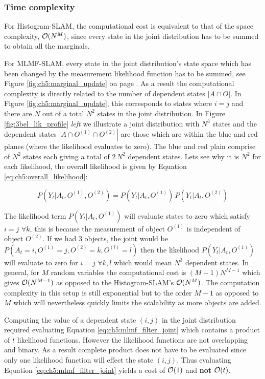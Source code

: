 \subsubsection{Time complexity}

For Histogram-SLAM, the computational cost is equivalent to that of the space complexity, $\operatorname{\mathcal{O}}(N^M)$,
since every state in the joint distribution has to be summed to obtain all the marginals.

For MLMF-SLAM, every state in the joint distribution's state space which has been changed by the measurement likelihood function 
has to be summed, see Figure \ref{fig:ch5:marginal_update} on page \pageref{fig:ch5:marginal_update}. As a result the computational complexity is directly related to the number 
of dependent states $|A \cap O|$. In Figure \ref{fig:ch5:marginal_update}, this corresponds to states where $i = j$ and there are $N$ out of a total $N^2$ states
in the joint distribution. In Figure \ref{fig:3bel_lik_profile} \textit{left}
we illustrate a joint distribution with $N^3$ states and the dependent states $|A \cap O^{(1)} \cap O^{(2)}|$ are those which 
are within the blue and red planes (where the likelihood evaluates to zero). The blue and red plain comprise of $N^2$ states each 
giving a total of $2\,N^2$ dependent states. Lets see why it is $N^2$ for each likelihood, the overall likelihood is given by 
Equation \ref{eq:ch5:overall_likelihood}:

\begin{equation}
 P(Y_t|A_t,O^{(1)},O^{(2)}) = P(Y_t|A_t,O^{(1)})\, P(Y_t|A_t,O^{(2)}) \label{eq:ch5:overall_likelihood}
\end{equation}

The likelihood term $P(Y_t|A_t,O^{(1)})$ will evaluate states to zero which satisfy $i=j$ $\forall k$, this is because 
the measurement of object $O^{(1)}$ is independent of object $O^{(2)}$. If we had 3 objects, the joint would be
$P(A_t=i,O^{(1)}=j,O^{(2)}=k,O^{(l)}=l)$ then the likelihood $P(Y_t|A_t,O^{(1)})$ will evaluate to 
zero for $i=j$ $\forall k,l$ which would mean $N^3$ dependent states.
In general, for $M$ random variables the computational cost is $(M-1) N^{M-1}$ which gives $\operatorname{\mathcal{O}}(N^{M-1})$ as opposed to the Histogram-SLAM's $\operatorname{\mathcal{O}}(N^M)$. 
The computation complexity in this setup is still exponential but to the order $M-1$ as opposed to $M$ which will nevertheless 
quickly limits the scalability as more objects are added. 

Computing the value of a dependent state $(i,j)$ in the joint distribution required evaluating Equation \ref{eq:ch5:mlmf_filter_joint} which
contains a product of $t$ likelihood functions. However the likelihood functions are not overlapping and binary. As a result complete product
does not have to be evaluated since only one likelihood function will effect the state $(i,j)$. Thus evaluating Equation \ref{eq:ch5:mlmf_filter_joint}
yields a cost of $\operatorname{\mathcal{O}}(1)$ and \textbf{not} $\operatorname{\mathcal{O}}(t)$.

